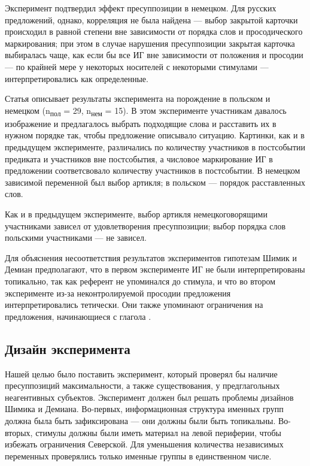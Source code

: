 \documentclass[a4paper, 12pt]{article}
\begin{document}
Эксперимент подтвердил эффект пресуппозиции в немецком. Для русских предложений, однако, корреляция не была найдена — выбор закрытой карточки происходил в равной степени вне зависимости от порядка слов и просодического маркирования; при этом в случае нарушения пресуппозиции закрытая карточка выбиралась чаще, как если бы все ИГ вне зависимости от положения и просодии — по крайней мере у некоторых носителей с некоторыми стимулами — интерпретировались как определенные.

Статья \textcite{simik2021uniquenessmaximalitygerman} описывает результаты эксперимента на порождение в польском и немецком (n\textsubscript{пол} = 29, n\textsubscript{нем} = 15). В этом эксперименте участникам давалось изображение и предлагалось выбрать подходящие слова и расставить их в нужном порядке так, чтобы предложение описывало ситуацию. Картинки, как и в предыдущем эксперименте, различались по количеству участников в постсобытии предиката и участников вне постсобытия, а числовое маркирование ИГ в предложении соответсвовало количеству участников в постсобытии. В немецком зависимой переменной был выбор артикля; в польском — порядок расставленных слов.

Как и в предыдущем эксперименте, выбор артикля немецкоговорящими участниками зависел от удовлетворения пресуппозиции; выбор порядка слов польскими участниками — не зависел.

Для объяснения несоответствия результатов экспериментов гипотезам Шимик и Демиан предполагают, что в первом эксперименте ИГ не были интерпретированы топикально, так как референт не упоминался до стимула, и что во втором эксперименте из-за неконтролируемой просодии предложения интерпретировались тетически. Они также упоминают ограничения на предложения, начинающиеся с глагола \parencite{siewierska1993subjectobjectorder}.

\subsection{Дизайн эксперимента}

Нашей целью было поставить эксперимент, который проверял бы наличие пресуппозиций максимальности, а также существования, у предглагольных неагентивных субъектов. Эксперимент должен был решать проблемы дизайнов Шимика и Демиана. Во-первых, информационная структура именных групп должна была быть зафиксирована — они должны были быть топикальны. Во-вторых, стимулы должны были иметь материал на левой периферии, чтобы избежать ограничения Северской. Для уменьшения количества независимых переменных проверялись только именные группы в единственном числе. 
\end{document}
